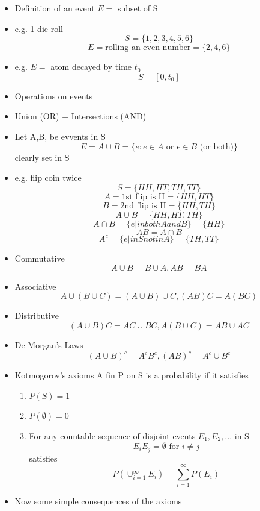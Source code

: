 \begin{itemize}
      \item Definition of an event $E=$ subset of S
      \item e.g. 1 die roll
            \[ S = \{1, 2, 3, 4, 5, 6\}\]
            \[ E = \text{rolling an even number} = \{2, 4, 6\}\]
      \item e.g. $E=$ atom decayed by time $t_0$
            \[ S = [0, t_0] \]
      \item Operations on events
      \item Union (OR) + Intersections (AND)
      \item Let A,B, be evvents in S
            \[ E = A \cup B = \{e: e \in A \text{ or } e \in B \text{ (or both)}\}\]
            clearly set in S
      \item e.g. flip coin twice
            \[ S = \{HH, HT, TH, TT\}\]
            \[ A = \text{1st flip is H} = \{HH, HT\}\]
            \[ B = \text{2nd flip is H} = \{HH, TH\}\]
            \[ A \cup B = \{HH, HT, TH\}\]
            \[ A \cap B = \{ e | in both A and B\} = \{HH\}\]
            \[ A B = A \cap B\]
            \[ A^c = \{ e | in S not in A\} = \{TH, TT\}\]
      \item Commutative
            \[ A \cup B = B \cup A, A B = B A\]
      \item Associative
            \[ A \cup (B \cup C) = (A \cup B) \cup C , (AB)C = A(BC)\]
      \item Distributive
            \[ (A\cup B)C = AC \cup BC, A(B \cup C) = AB \cup AC\]
      \item De Morgan's Laws
            \[ (A \cup B)^c = A^c B^c, (AB)^c = A^c \cup B^c\]
      \item Kotmogorov's axioms
            A fin P on S is a probability if it satisfies
            \begin{enumerate}
                  \item $P(S) = 1$
                  \item $P(\emptyset) = 0$
                  \item For any countable sequence of disjoint events $E_1, E_2, ...$ in S
                        \[ E_i E_j = \emptyset \text{ for } i \neq j\]
                        satisfies
                        \[ P(\cup_{i=1}^{\infty} E_i) = \sum_{i=1}^{\infty} P(E_i)\]
            \end{enumerate}
      \item Now some simple consequences of the axioms
            \begin{enumerate}

\end{enumerate}
\end{itemize}
